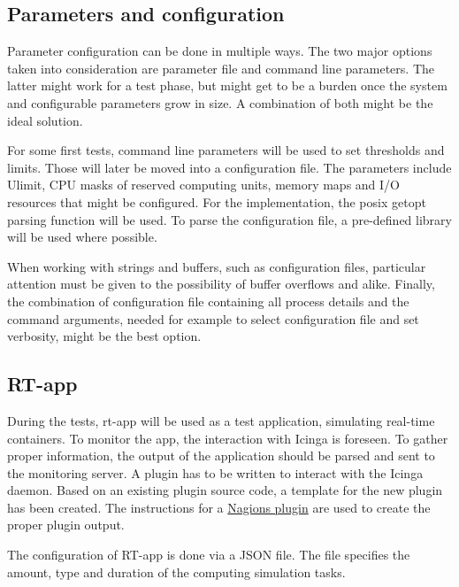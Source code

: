 \documentclass[]{scrartcl}
\begin{document}
\subsection{Parameters and configuration}

Parameter configuration can be done in multiple ways. The two major options taken into consideration are parameter file and command line parameters.
The latter might work for a test phase, but might get to be a burden once the system and configurable parameters grow in size.
A combination of both might be the ideal solution.

For some first tests, command line parameters will be used to set thresholds and limits. Those will later be moved into a configuration file.
The parameters include Ulimit, CPU masks of reserved computing units, memory maps and I/O resources that might be configured. 
For the implementation, the posix getopt parsing function will be used.
To parse the configuration file, a pre-defined library will be used where possible.

When working with strings and buffers, such as configuration files, particular attention must be given to the possibility of buffer overflows and alike.
Finally, the combination of configuration file containing all process details and the command arguments, needed for example to select configuration file and set verbosity, might be the best option.

\subsection{RT-app}

During the tests, rt-app will be used as a test application, simulating real-time containers. 
To monitor the app, the interaction with Icinga is foreseen.
To gather proper information, the output of the application should be parsed and sent to the monitoring server.
A plugin has to be written to interact with the Icinga daemon.
Based on an existing plugin source code, a template for the new plugin has been created. 
The instructions for a \href{{https://nagios-plugins.org/doc/guidelines.html#DEVREQUIREMENTS}}{Nagions plugin} are used to create the proper plugin output.


The configuration of RT-app is done via a JSON file. The file specifies the amount, type and duration of the computing simulation tasks.
\end{document}
